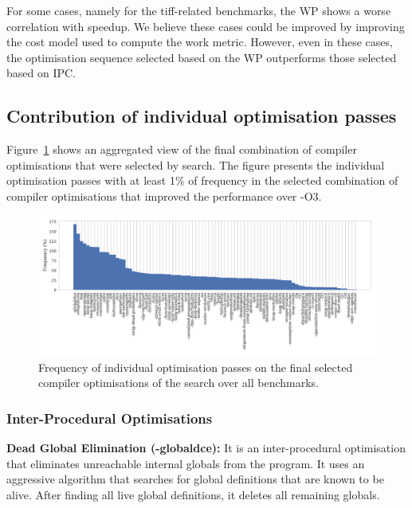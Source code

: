 For some cases, namely for the tiff-related benchmarks, the WP shows a worse correlation with speedup.
We believe these cases could be improved by improving the cost model used to compute the work metric.
However, even in these cases, the optimisation sequence selected based on the WP outperforms those selected based on IPC.

\subsection{Contribution of individual optimisation passes}

Figure~\ref{fig:flagsfreq} shows an aggregated view of the final combination of compiler optimisations that were selected by {\itercomp} search.
The figure presents the individual optimisation passes with at least 1\% of frequency in the selected combination of compiler optimisations that improved the performance over {\flagstype -O3}.

\begin{figure}[htb]
    \centering
    \includegraphics[width=\textwidth]{figs/flagsfreq.pdf}
    \caption{Frequency of individual optimisation passes on the final selected 
             compiler optimisations of the {\itercomp} search over
             all benchmarks.}
    \label{fig:flagsfreq}
\end{figure}

\subsubsection{Inter-Procedural Optimisations}
\noindent\textbf{Dead Global Elimination ({\flagstype -globaldce}):}
It is an inter-procedural optimisation that eliminates unreachable internal globals from the program.
It uses an aggressive algorithm that searches for global definitions that are known to be alive.
After finding all live global definitions, it deletes all remaining globals.

